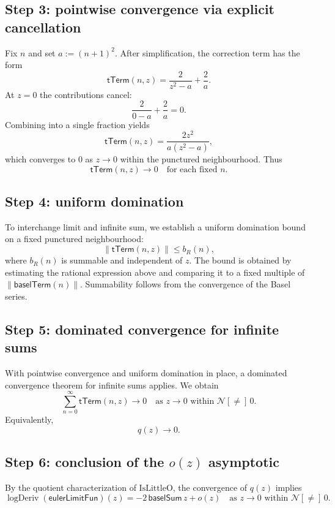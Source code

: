 \documentclass[11pt,a4paper]{article}
\theoremstyle{plain}
\theoremstyle{definition}
\newcommand{\nhdsPunct}[1]{\ensuremath{\mathcal{N}[{\neq}]\,#1}}
\newcommand{\baselSum}{\ensuremath{\mathsf{baselSum}}}
\newcommand{\baselTerm}{\ensuremath{\mathsf{baselTerm}}}
\newcommand{\eulerLimitFun}{\ensuremath{\mathsf{eulerLimitFun}}}
\DeclareMathOperator{\logDeriv}{logDeriv}
\begin{document}
\subsection{Step 3: pointwise convergence via explicit cancellation}

Fix \(n\) and set \(a := (n+1)^{2}\). After simplification, the correction term has the form
\[
\mathsf{tTerm}(n,z)
=
\frac{2}{z^{2}-a}
+
\frac{2}{a}.
\]
At \(z = 0\) the contributions cancel:
\[
\frac{2}{0-a}
+
\frac{2}{a}
=
0.
\]
Combining into a single fraction yields
\[
\mathsf{tTerm}(n,z)
=
\frac{2 z^{2}}{a(z^{2}-a)},
\]
which converges to \(0\) as \(z \to 0\) within the punctured neighbourhood. Thus
\[
\mathsf{tTerm}(n,z) \to 0
\quad
\text{for each fixed } n.
\]

\subsection{Step 4: uniform domination}

To interchange limit and infinite sum, we establish a uniform domination bound on a fixed punctured neighbourhood:
\[
\lVert \mathsf{tTerm}(n,z) \rVert
\le
b_{R}(n),
\]
where \(b_{R}(n)\) is summable and independent of \(z\). The bound is obtained by estimating the rational expression above and comparing it to a fixed multiple of \(\lVert \baselTerm(n) \rVert\). Summability follows from the convergence of the Basel series.

\subsection{Step 5: dominated convergence for infinite sums}

With pointwise convergence and uniform domination in place, a dominated convergence theorem for infinite sums applies. We obtain
\[
\sum_{n=0}^{\infty} \mathsf{tTerm}(n,z)
\to
0
\quad
\text{as } z \to 0 \text{ within } \nhdsPunct{0}.
\]
Equivalently,
\[
q(z) \to 0.
\]

\subsection{Step 6: conclusion of the \texorpdfstring{$o(z)$}{o(z)} asymptotic}

By the quotient characterization of \(\mathrm{IsLittleO}\), the convergence of \(q(z)\) implies
\[
\logDeriv(\eulerLimitFun)(z)
=
-2\,\baselSum\, z
+
o(z)
\quad
\text{as } z \to 0 \text{ within } \nhdsPunct{0}.
\]
\end{document}
